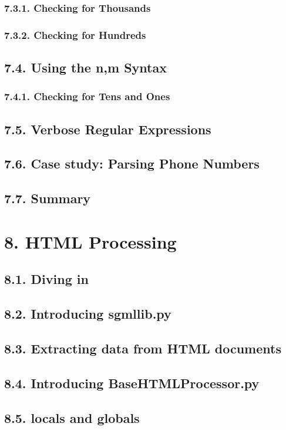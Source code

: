 \documentclass[oneside,12pt]{book}
\begin{document}
\subsection{7.3.1. Checking for Thousands}
\subsection{7.3.2. Checking for Hundreds}
       
\section{7.4. Using the {n,m} Syntax}
\subsection{7.4.1. Checking for Tens and Ones}
       
\section{7.5. Verbose Regular Expressions}
\section{7.6. Case study: Parsing Phone Numbers}
\section{7.7. Summary}
   
\chapter{8. HTML Processing}
\section{8.1. Diving in}
\section{8.2. Introducing sgmllib.py}
\section{8.3. Extracting data from HTML documents}
\section{8.4. Introducing BaseHTMLProcessor.py}
\section{8.5. locals and globals}
\end{document}
